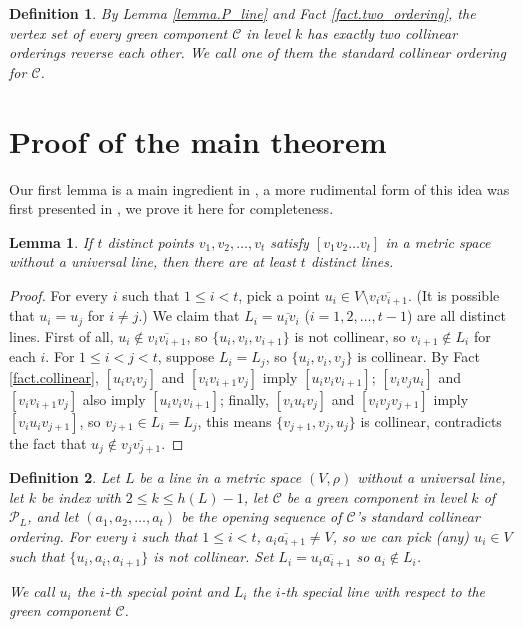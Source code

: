 \documentclass[12pt]{article}
\newcommand{\ov}{\overline}
\newtheorem{lem}{Lemma}
\newtheorem{defi}{Definition}
\begin{document}
\begin{defi}
By Lemma \ref{lemma.P_line} and Fact \ref{fact.two_ordering},
the vertex set of every green component $\mathcal{C}$ in level $k$
has exactly two collinear orderings reverse each other.
We call one of them the {\em standard collinear ordering} for $\mathcal{C}$.
\end{defi}

\section{Proof of the main theorem}\label{sect.proof_main}

Our first lemma is a main ingredient in \cite{ACHKS},
a more rudimental form of this idea was first presented in \cite{KP},
we prove it here for completeness.

\begin{lem}\label{lem.long_path}
If $t$ distinct points $v_1, v_2, \dots, v_t$ satisfy
$[v_1v_2\dots v_t]$ in a metric space without a universal line,
then there are at least $t$ distinct lines.
\end{lem}

\begin{proof}
For every $i$ such that $1 \le i < t$, pick a point $u_i \in V \setminus \ov{v_iv_{i+1}}$. (It is possible that $u_i = u_j$ for $i \neq j$.)
We claim that $L_i = \ov{u_iv_i}$ ($i=1, 2, \dots, t-1$) are all distinct lines. 
First of all, $u_i \not\in \ov{v_iv_{i+1}}$, so $\{u_i, v_i, v_{i+1}\}$ is not collinear,
so $v_{i+1} \not\in L_i$ for each $i$. For $1 \le i < j < t$,
suppose $L_i = L_j$, so $\{u_i, v_i, v_j\}$ is collinear.
By Fact \ref{fact.collinear}, $[u_iv_iv_j]$ and $[v_iv_{i+1}v_j]$ imply $[u_iv_iv_{i+1}]$;
$[v_iv_ju_i]$ and $[v_iv_{i+1}v_j]$ also imply $[u_iv_iv_{i+1}]$;
finally, $[v_iu_iv_j]$ and $[v_iv_jv_{j+1}]$ imply $[v_iu_iv_{j+1}]$,
so $v_{j+1} \in L_i = L_j$, this means $\{v_{j+1}, v_j, u_j\}$ is collinear,
contradicts the fact that $u_j \not\in \ov{v_jv_{j+1}}$.
\end{proof}

\begin{defi}
Let $L$ be a line in a metric space $(V, \rho)$ without a universal line,
let $k$ be index with $2 \le k \le h(L)-1$,  
let $\mathcal{C}$ be a green component in level $k$ of $\mathcal{P}_L$,
and let $(a_1, a_2, \dots, a_t)$ be the opening sequence of $\mathcal{C}$'s standard collinear ordering.
For every $i$ such that $1 \le i < t$, $\ov{a_ia_{i+1}} \neq V$, so we can pick (any) $u_i \in V$
such that $\{u_i, a_i, a_{i+1}\}$ is not collinear. Set $L_i = \ov{u_i a_{i+1}}$
so $a_i \not\in L_i$.

We call $u_i$ the $i$-th special point and $L_i$ the $i$-th special line
with respect to the green component $\mathcal{C}$.
\end{defi}
\end{document}
